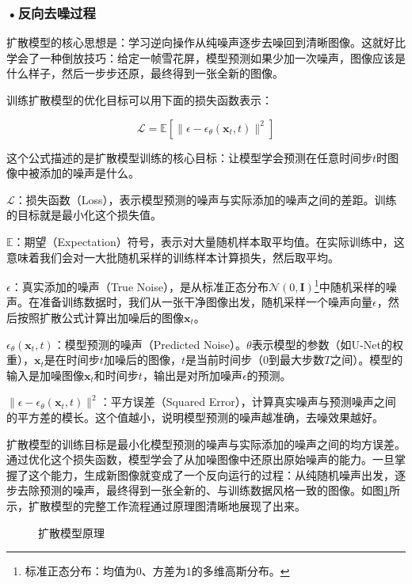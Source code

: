 \subsubsection*{\textbf{•反向去噪过程}}

扩散模型的核心思想是：学习逆向操作从纯噪声逐步去噪回到清晰图像。这就好比学会了一种倒放技巧：给定一帧雪花屏，模型预测如果少加一次噪声，图像应该是什么样子，然后一步步还原，最终得到一张全新的图像。

训练扩散模型的优化目标可以用下面的损失函数表示：

\[
\mathcal{L} = \mathbb{E}\left[ \| \epsilon - \epsilon_{\theta}(\mathbf{x}_t, t) \|^2 \right]
\]

这个公式描述的是扩散模型训练的核心目标：让模型学会预测在任意时间步$t$时图像中被添加的噪声是什么。



$\mathcal{L}$：损失函数（Loss），表示模型预测的噪声与实际添加的噪声之间的差距。训练的目标就是最小化这个损失值。

$\mathbb{E}$：期望（Expectation）符号，表示对大量随机样本取平均值。在实际训练中，这意味着我们会对一大批随机采样的训练样本计算损失，然后取平均。

$\epsilon$：真实添加的噪声（True Noise），是从标准正态分布$\mathcal{N}(0, \mathbf{I})$\footnote{标准正态分布：均值为0、方差为1的多维高斯分布。}中随机采样的噪声。在准备训练数据时，我们从一张干净图像出发，随机采样一个噪声向量$\epsilon$，然后按照扩散公式计算出加噪后的图像$\mathbf{x}_t$。

$\epsilon_{\theta}(\mathbf{x}_t, t)$：模型预测的噪声（Predicted Noise）。$\theta$表示模型的参数（如U-Net的权重），$\mathbf{x}_t$是在时间步$t$加噪后的图像，$t$是当前时间步（0到最大步数$T$之间）。模型的输入是加噪图像$\mathbf{x}_t$和时间步$t$，输出是对所加噪声$\epsilon$的预测。

$\| \epsilon - \epsilon_{\theta}(\mathbf{x}_t, t) \|^2$：平方误差（Squared Error），计算真实噪声与预测噪声之间的平方差的模长。这个值越小，说明模型预测的噪声越准确，去噪效果越好。

扩散模型的训练目标是最小化模型预测的噪声与实际添加的噪声之间的均方误差。通过优化这个损失函数，模型学会了从加噪图像中还原出原始噪声的能力。一旦掌握了这个能力，生成新图像就变成了一个反向运行的过程：从纯随机噪声出发，逐步去除预测的噪声，最终得到一张全新的、与训练数据风格一致的图像。如图\ref{fig:ch2_2_28}所示，扩散模型的完整工作流程通过原理图清晰地展现了出来。

\begin{figure}[H]
\centering
{}
\caption{扩散模型原理}
\label{fig:ch2_2_28}
\end{figure}


